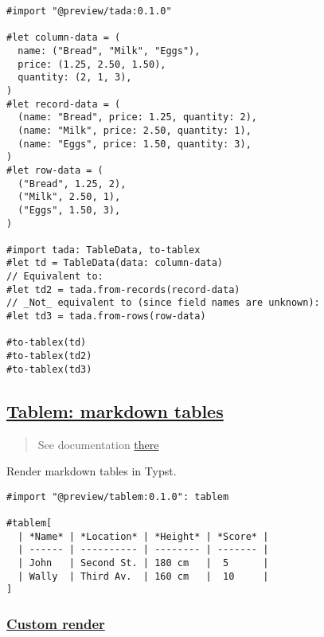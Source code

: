 \begin{verbatim}
#import "@preview/tada:0.1.0"

#let column-data = (
  name: ("Bread", "Milk", "Eggs"),
  price: (1.25, 2.50, 1.50),
  quantity: (2, 1, 3),
)
#let record-data = (
  (name: "Bread", price: 1.25, quantity: 2),
  (name: "Milk", price: 2.50, quantity: 1),
  (name: "Eggs", price: 1.50, quantity: 3),
)
#let row-data = (
  ("Bread", 1.25, 2),
  ("Milk", 2.50, 1),
  ("Eggs", 1.50, 3),
)

#import tada: TableData, to-tablex
#let td = TableData(data: column-data)
// Equivalent to:
#let td2 = tada.from-records(record-data)
// _Not_ equivalent to (since field names are unknown):
#let td3 = tada.from-rows(row-data)

#to-tablex(td)
#to-tablex(td2)
#to-tablex(td3)
\end{verbatim}

\pandocbounded{}

\subsection{\texorpdfstring{\hyperref[tablem-markdown-tables]{Tablem:
markdown
tables}}{Tablem: markdown tables}}\label{tablem-markdown-tables}

\begin{quote}
See documentation \href{https://github.com/OrangeX4/typst-tablem}{there}
\end{quote}

Render markdown tables in Typst.

\begin{verbatim}
#import "@preview/tablem:0.1.0": tablem

#tablem[
  | *Name* | *Location* | *Height* | *Score* |
  | ------ | ---------- | -------- | ------- |
  | John   | Second St. | 180 cm   |  5      |
  | Wally  | Third Av.  | 160 cm   |  10     |
]
\end{verbatim}

\pandocbounded{}

\subsubsection{\texorpdfstring{\hyperref[custom-render]{Custom
render}}{Custom render}}\label{custom-render}


